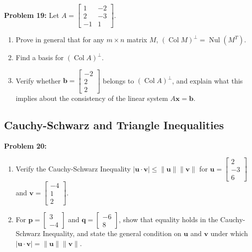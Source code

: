 \documentclass[11pt, letterpaper]{article}
\theoremstyle{definition}
\theoremstyle{remark}
\begin{document}
\textbf{Problem 19:} Let $A = \begin{bmatrix} 1 & -2 \\ 2 & -3 \\ -1 & 1 \end{bmatrix}$.
\begin{enumerate}[label=(\alph*)]
    \item Prove in general that for any $m \times n$ matrix $M$, $(\operatorname{Col} M)^{\perp} = \operatorname{Nul}(M^T)$.
    \item Find a basis for $(\operatorname{Col} A)^{\perp}$.
    \item Verify whether $\mathbf{b} = \begin{bmatrix} -2 \\ 2 \\ 2 \end{bmatrix}$ belongs to $(\operatorname{Col} A)^{\perp}$, and explain what this implies about the consistency of the linear system $A\mathbf{x} = \mathbf{b}$.
\end{enumerate}

\subsection{Cauchy-Schwarz and Triangle Inequalities}

\textbf{Problem 20:}
\begin{enumerate}[label=(\alph*)]
    \item Verify the Cauchy-Schwarz Inequality $|\mathbf{u} \cdot \mathbf{v}| \le \|\mathbf{u}\|\|\mathbf{v}\|$ for $\mathbf{u} = \begin{bmatrix} 2 \\ -3 \\ 6 \end{bmatrix}$ and $\mathbf{v} = \begin{bmatrix} -4 \\ 1 \\ 2 \end{bmatrix}$.
    \item For $\mathbf{p} = \begin{bmatrix} 3 \\ -4 \end{bmatrix}$ and $\mathbf{q} = \begin{bmatrix} -6 \\ 8 \end{bmatrix}$, show that equality holds in the Cauchy-Schwarz Inequality, and state the general condition on $\mathbf{u}$ and $\mathbf{v}$ under which $|\mathbf{u} \cdot \mathbf{v}| = \|\mathbf{u}\|\|\mathbf{v}\|$.
\end{enumerate}
\end{document}

